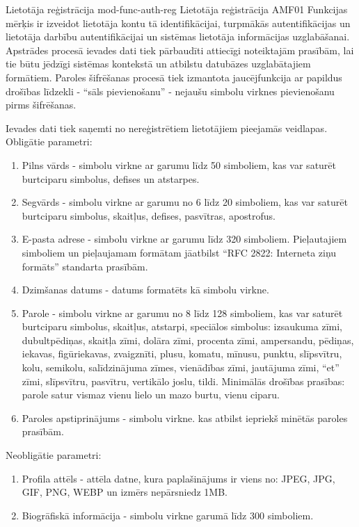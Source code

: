\moduleFunctionTable
{Lietotāja reģistrācija}
{mod-func-auth-reg}
{Lietotāja reģistrācija}
{AMF01}
{
	Funkcijas mērķis ir izveidot lietotāja kontu tā identifikācijai, turpmākās autentifikācijas un lietotāja darbību autentifikācijai un sistēmas lietotāja informācijas uzglabāšanai.
	Apstrādes procesā ievades dati tiek pārbaudīti attiecīgi noteiktajām prasībām, lai tie būtu jēdzīgi sistēmas kontekstā un atbilstu datubāzes uzglabātajiem formātiem.
	Paroles šifrēšanas procesā tiek izmantota jaucējfunkcija ar papildus drošības līdzekli - ``sāls pievienošanu'' - nejaušu simbolu virknes pievienošanu pirms šifrēšanas.
}
{
	Ievades dati tiek saņemti no nereģistrētiem lietotājiem pieejamās veidlapas. \\

	Obligātie parametri:
	\begin{enumerate}
		\item Pilns vārds - simbolu virkne ar garumu līdz 50 simboliem, kas var saturēt burtciparu simbolus, defises un atstarpes.
		\item Segvārds - simbolu virkne ar garumu no 6 līdz 20 simboliem, kas var saturēt burtciparu simbolus, skaitļus, defises, pasvītras, apostrofus.
		\item E-pasta adrese - simbolu virkne ar garumu līdz 320 simboliem. Pieļautajiem simboliem un pieļaujamam formātam jāatbilst ``RFC 2822: Interneta ziņu formāts'' standarta prasībām.
		\item Dzimšanas datums - datums formatēts kā simbolu virkne.
		\item Parole - simbolu virkne ar garumu no 8 līdz 128 simboliem, kas var saturēt burtciparu simbolus, skaitļus, atstarpi, speciālos simbolus: izsaukuma zīmi, dubultpēdiņas, skaitļa zīmi, dolāra zīmi, procenta zīmi, ampersandu, pēdiņas, iekavas, figūriekavas, zvaigznīti, plusu, komatu, mīnusu, punktu, slīpsvītru, kolu, semikolu, salīdzinājuma zīmes, vienādības zīmi, jautājuma zīmi, “et” zīmi, slīpsvītru, pasvītru, vertikālo joslu, tildi. Minimālās drošības prasības: parole satur vismaz vienu lielo un mazo burtu, vienu ciparu.
		\item Paroles apstiprinājums - simbolu virkne. kas atbilst iepriekš minētās paroles prasībām.
	\end{enumerate}

	Neobligātie parametri:
	\begin{enumerate}
		\item Profila attēls - attēla datne, kura paplašinājums ir viens no: JPEG, JPG, GIF, PNG, WEBP un izmērs nepārsniedz 1MB.
		\item Biogrāfiskā informācija - simbolu virkne garumā līdz 300 simboliem.
	\end{enumerate}
}
